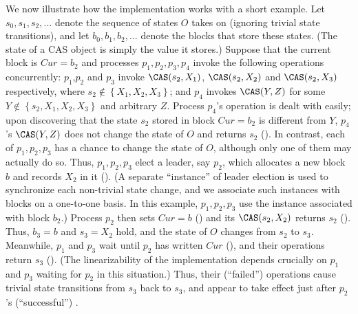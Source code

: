 \documentclass[11pt,letterpaper]{article}
\begin{document}
We now illustrate how the implementation works with a short example.
Let $s_0, s_1, s_2, ...$ denote the sequence of states
  $O$ takes on (ignoring trivial state transitions),
  and let $b_0, b_1, b_2, ...$ denote the blocks that store these states.
(The state of a CAS object is simply the value it stores.)
Suppose that the current block is $Cur = b_2$ and processes $p_1,p_2,p_3,p_4$ invoke
  the following operations concurrently:
  $p_1$,$p_2$ and $p_3$ invoke $\CAS(s_2, X_1)$, $\CAS(s_2, X_2)$ and $\CAS(s_2, X_3)$ respectively,
  where $s_2 \not\in \left\{X_1, X_2, X_3\right\}$; and
  $p_4$ invokes $\CAS(Y, Z)$ for some $Y \not\in \left\{s_2, X_1, X_2, X_3\right\}$ and arbitrary $Z$.
Process $p_4$'s operation is dealt with easily; upon discovering that the state $s_2$ stored in block $Cur = b_2$
  is different from $Y$, $p_4$'s $\CAS(Y, Z)$ does not change the state of $O$ and returns $s_2$ ().
In contrast, each of $p_1,p_2,p_3$ has a chance to change the state of $O$, although only one of them may actually do so.
Thus, $p_1,p_2,p_3$ elect a leader, say $p_2$, which allocates a new block $b$ and records $X_2$ in it ().
(A separate ``instance'' of leader election is used to synchronize each non-trivial state change, and we associate
   such instances with blocks on a one-to-one basis.
In this example, $p_1,p_2,p_3$ use the instance associated with block $b_2$.)
Process $p_2$ then sets $Cur = b$ () and its $\CAS(s_2, X_2)$ returns $s_2$ ().
Thus, $b_3 = b$ and $s_3 = X_2$ hold, and the state of $O$ changes from $s_2$ to $s_3$.
Meanwhile, $p_1$ and $p_3$ wait until $p_2$ has written $Cur$ (),
  and their operations return $s_3$ ().
(The linearizability of the implementation depends crucially on $p_1$ and $p_3$ waiting for $p_2$ in this situation.)
Thus, their (``failed'') \CAS operations cause trivial state transitions from $s_3$ back to $s_3$, and appear to take
   effect just after $p_2$'s (``successful'') \CAS.
\end{document}
